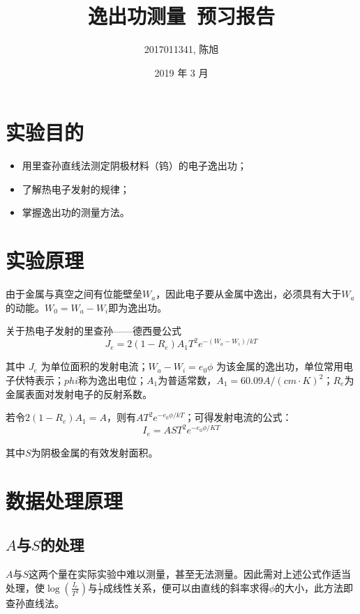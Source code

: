 \documentclass[a4paper]{article}
\title{逸出功测量\ 预习报告}
\author{2017011341, 陈旭}
\date{2019 年 3 月}
\begin{document}
\maketitle

\section{实验目的}

\begin{itemize}
	\item 用里查孙直线法测定阴极材料（钨）的电子逸出功；
	\item 了解热电子发射的规律；
	\item 掌握逸出功的测量方法。
\end{itemize}

\section{实验原理}

\par 由于金属与真空之间有位能壁垒$W_a$，因此电子要从金属中逸出，必须具有大于$W_a$的动能。$W_0=W_a-W_i$即为逸出功。

\par 关于热电子发射的里查孙——德西曼公式
$$J_e=2(1-R_e)A_1T^2e^{-(W_a-W_i)/kT}$$
\par 其中 $J_e$ 为单位面积的发射电流；$W_a-W_i=e_0 \phi$ 为该金属的逸出功，单位常用电子伏特表示；$phi$称为逸出电位；$A_1$为普适常数，$A_1=60.09A/(cm\cdot K)^2$；$R_e$为金属表面对发射电子的反射系数。

\par 若令$2(1-R_e)A_1=A$，则有$AT^2e^{-e_0\phi/kT}$；可得发射电流的公式：
$$I_e=AST^2e^{-e_0\phi/KT}$$
\par 其中$S$为阴极金属的有效发射面积。

\section{数据处理原理}

\subsection{$A$与$S$的处理}

\par $A$与$S$这两个量在实际实验中难以测量，甚至无法测量。因此需对上述公式作适当处理，使$\log(\frac{I_e}{T^2})$与$\frac{1}{T}$成线性关系，便可以由直线的斜率求得$\phi$的大小，此方法即查孙直线法。
\end{document}
